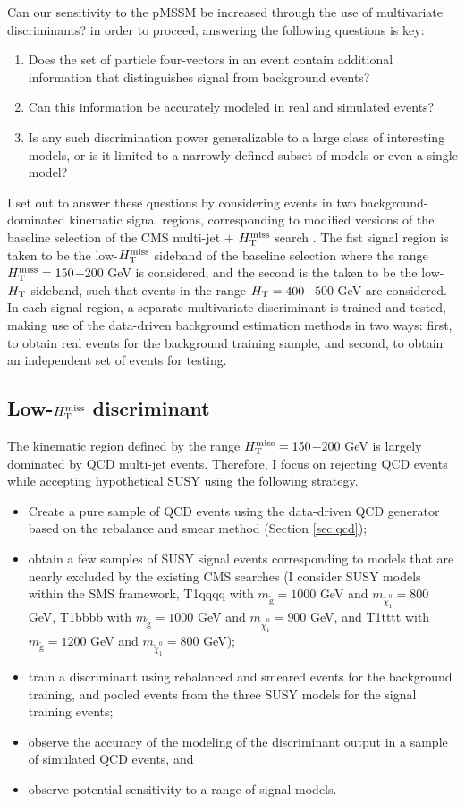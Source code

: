 Can our sensitivity to the pMSSM be increased through the use of multivariate discriminants? in order to proceed, answering the following questions is key:
\begin{enumerate}
\item Does the set of particle four-vectors in an event contain additional information that distinguishes signal from background events?
\item Can this information be accurately modeled in real and simulated events?
\item Is any such discrimination power generalizable to a large class of interesting models, or is it limited to a narrowly-defined subset of models or even a single model?
\end{enumerate}
I set out to answer these questions by considering events in two background-dominated kinematic signal regions, corresponding to modified versions of the baseline selection of the CMS multi-jet $+$ $H_{\text{T}}^{\rm miss}$ search \cite{Khachatryan:2016kdk}. The fist signal region is taken to be the low-$H_{\text{T}}^{\rm miss}$ sideband of the baseline selection \cite{Khachatryan:2016kdk} where the range $H_{\text{T}}^{\rm miss}=150$$-$$200$ GeV is considered, and the second is the taken to be the low-$H_{\rm T}$  sideband, such that events in the range $H_{\rm T}=400$$-$$500$ GeV are considered. In each signal region, a separate multivariate discriminant is trained and tested, making use of the data-driven background estimation methods in two ways: first, to obtain real events for the background training sample, and second, to obtain an independent set of events for testing. 

\subsection{Low-$H_{\text{T}}^{\rm miss}$ discriminant}
The kinematic region defined by the range $H_{\text{T}}^{\rm miss}=150$$-$$200$ GeV is largely dominated by QCD multi-jet events. Therefore, I focus on rejecting QCD events while accepting hypothetical SUSY using the following strategy.
\begin{itemize}
\item Create a pure sample of QCD events using the data-driven QCD generator based on the rebalance and smear method (Section \ref{sec:qcd});
\item obtain a few samples of SUSY signal events corresponding to models that are nearly excluded by the existing CMS searches (I consider SUSY models within the SMS framework, T1qqqq with $m_{\tilde{\text{g}}}=1000$ GeV and $m_{\tilde{\chi}^{0}_{1}}=800$ GeV,  T1bbbb with $m_{\tilde{\text{g}}}=1000$ GeV and $m_{\tilde{\chi}^{0}_{1}}=900$ GeV, and T1tttt with $m_{\tilde{\text{g}}}=1200$ GeV and $m_{\tilde{\chi}^{0}_{1}}=800$ GeV);
\item train a discriminant using rebalanced and smeared events for the background training, and pooled events from the three SUSY models for the signal training events;
\item observe the accuracy of the modeling of the discriminant output in a sample of simulated QCD events, and
\item observe potential sensitivity to a range of signal models.
\end{itemize}

